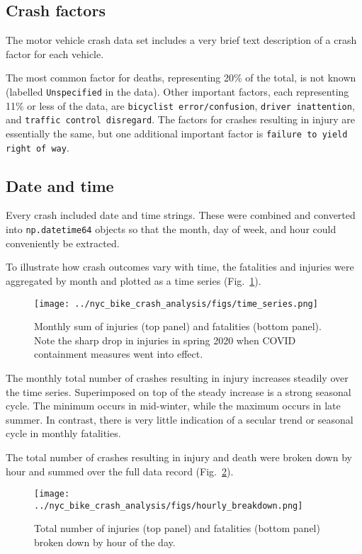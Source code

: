 \documentclass[twocolumn,oneside]{article}
\begin{document}
\subsection{Crash factors}

The motor vehicle crash data set includes a very brief text
description of a crash factor for each vehicle.

The most common factor for deaths, representing 20\% of the total, is
not known (labelled \verb+Unspecified+ in the data).  Other important
factors, each representing 11\% or less of the data, are
\verb+bicyclist error/confusion+, \verb+driver inattention+, and
\verb+traffic control disregard+.  The factors for crashes resulting
in injury are essentially the same, but one additional important
factor is \verb+failure to yield right of way+.


\subsection{Date and time}

Every crash included date and time strings.  These were combined and
converted into \verb+np.datetime64+ objects so that the month, day of
week, and hour could conveniently be extracted.

To illustrate how crash outcomes vary with time, the fatalities and
injuries were aggregated by month and plotted as a time series
(Fig.~\ref{fig:timeseries}).

\begin{figure}[h]
\centering
  \texttt{[image: ../nyc\_bike\_crash\_analysis/figs/time\_series.png]}
  \caption{Monthly sum of injuries (top panel) and fatalities
    (bottom panel).  Note the sharp drop in injuries in spring 2020
    when COVID containment measures went into effect.}
\label{fig:timeseries}
\end{figure}

The monthly total number of crashes resulting in injury increases
steadily over the time series.  Superimposed on top of the steady
increase is a strong seasonal cycle.  The minimum occurs in
mid-winter, while the maximum occurs in late summer.  In contrast,
there is very little indication of a secular trend or seasonal cycle in
monthly fatalities.

The total number of crashes resulting in injury and death were broken
down by hour and summed over the full data record
(Fig.~\ref{fig:hours}).

\begin{figure}[h]
\centering
  \texttt{[image: ../nyc\_bike\_crash\_analysis/figs/hourly\_breakdown.png]}
  \caption{Total number of injuries (top panel) and fatalities (bottom panel) broken down by hour of the day.}
\label{fig:hours}
\end{figure}
\end{document}
